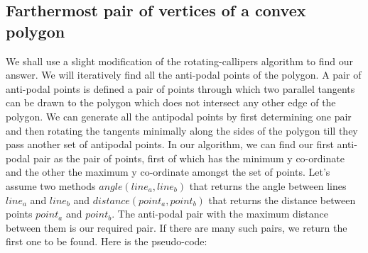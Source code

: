 \documentclass{article}
\begin{document}
\subsection{Farthermost pair of vertices of a convex polygon}
We shall use a slight modification of the rotating-callipers algorithm to find our answer. We will iteratively find all the anti-podal points of the polygon. A pair of anti-podal points is defined a pair of points through which two parallel tangents can be drawn to the polygon which does not intersect any other edge of the polygon. We can generate all the antipodal points by first determining one pair and then rotating the tangents minimally along the sides of the polygon till they pass another set of antipodal points. In our algorithm, we can find our first anti-podal pair as the pair of points, first of which has the minimum y co-ordinate and the other the maximum y co-ordinate amongst the set of points. Let's assume two methods $angle(line_a, line_b)$ that returns the angle between lines $line_a$ and $line_b$ and $distance(point_a, point_b)$ that returns the distance between points $point_a$ and $point_b$. The anti-podal pair with the maximum distance between them is our required pair. If there are many such pairs, we return the first one to be found. 
\newline Here is the pseudo-code:
\newline
\end{document}
